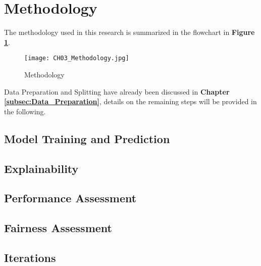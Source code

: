 \section{Methodology}\label{sec:Methodology}

The methodology used in this research is summarized in the flowchart in \textbf{Figure \ref{fig:CH03_Methodology}}. 

\begin{figure}[h]
    \centering
    \texttt{[image: CH03\_Methodology.jpg]}
    \caption{Methodology}
    \label{fig:CH03_Methodology}
\end{figure}

Data Preparation and Splitting have already been discussed in \textbf{Chapter \ref{subsec:Data_Preparation}}, details on the remaining steps will be provided in the following.

\subsection{Model Training and Prediction}\label{subsec:Model_Training_and_Prediction}


\subsection{Explainability}\label{subsec:Explainability}


\subsection{Performance Assessment}\label{subsec:Performance_Assessment}


\subsection{Fairness Assessment}\label{subsec:Fairness_Assessment}


\subsection{Iterations}\label{subsec:Iterations}

